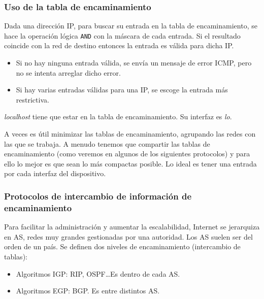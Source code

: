 \subsubsection{Uso de la tabla de encaminamiento}
Dada una dirección IP, para buscar su entrada en la tabla de encaminamiento, se hace la operación lógica \verb|AND| con la máscara de cada entrada. Si el resultado coincide con la red de destino entonces la entrada es válida para dicha IP\@.
\begin{itemize}
    \item Si no hay ninguna entrada válida, se envía un mensaje de error \acrshort{ICMP}, pero no se intenta arreglar dicho error.
    \item Si hay varias entradas válidas para una IP\@, se escoge la entrada más restrictiva. 

\end{itemize}

\begin{observacion}
    \textit{localhost} tiene que estar en la tabla de encaminamiento. Su interfaz es \textit{lo}.
\end{observacion}

A veces es útil minimizar las tablas de encaminamiento, agrupando las redes con las que se trabaja. A menudo tenemos que compartir las tablas de encaminamiento (como veremos en algunos de los siguientes protocolos) y para ello lo mejor es que sean lo más compactas posible. Lo ideal es tener una entrada por cada interfaz del dispositivo. 

\subsubsection{Protocolos de intercambio de información de encaminamiento}

Para facilitar la administración y aumentar la escalabilidad, Internet se jerarquiza en \acrfull{AS}, redes muy grandes gestionadas por una autoridad. Los \acrshort{AS} suelen ser del orden de un país. Se definen dos niveles de encaminamiento (intercambio de tablas):
\begin{itemize}
    \item Algoritmos \acrfull{IGP}: \acrshort{RIP}, \acrshort{OSPF}\ldots Es dentro de cada \acrshort{AS}.
    \item Algoritmos \acrfull{EGP}: \acrshort{BGP}. Es entre distintos \acrshort{AS}.
\end{itemize}

